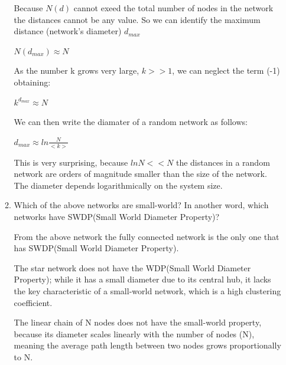 \documentclass{amsart}
\theoremstyle{definition}
\theoremstyle{remark}
\numberwithin{equation}{section}
\begin{document}
\begin{enumerate}
\begin{enumerate}
Because $ N\left(d\right) $ cannot exeed the total number of nodes in the network the distances cannot be any value. So we can identify the maximum distance (network's diameter) $d_{max}$

\vspace{0.2cm}

$
N\left(d_{max}\right) \approx N
$

\vspace{0.2cm}

As the number k grows very large, $k >> 1$, we can neglect the term (-1) obtaining:

\vspace{0.2cm}

$
k^{d_{max}} \approx N
$

\vspace{0.2cm}

We can then write the diamater of a random network as follows:

\vspace{0.2cm}

$
d_{max} \approx ln \frac{N}{<k>}
$

\vspace{0.2cm}

This is very surprising, because $ ln N << N$ the distances in a random network are orders of magnitude smaller than the size of the network. The diameter depends logarithmically on the system size.


\vspace{1cm}
\item Which of the above networks are small-world? In another word, which networks have SWDP(Small World Diameter Property)?

\vspace{0.2cm}

From the above network the fully connected network is the only one that has SWDP(Small World Diameter Property).

\vspace{0.2cm}

The star network does not have the WDP(Small World Diameter Property); while it has a small diameter due to its central hub, it lacks the key characteristic of a small-world network, which is a high clustering coefficient.

\vspace{0.2cm}

The linear chain of N nodes does not have the small-world property, because its diameter scales linearly with the number of nodes (N), meaning the average path length between two nodes grows proportionally to N.


\end{enumerate}
\end{enumerate}
\end{document}
